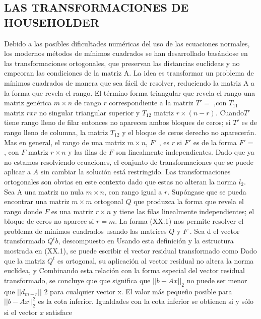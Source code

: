 \documentclass[twocolumn,twoside]{article}
\begin{document}
\subsection{LAS TRANSFORMACIONES DE HOUSEHOLDER}
Debido a las posibles dificultades numéricas del uso de las ecuaciones normales, los
modernos métodos de m\'inimos cuadrados se han desarrollado basándose en las transformaciones 
ortogonales, que preservan las distancias eucl\'ideas y no empeoran las
condiciones de la matriz A. La idea es transformar un problema de m\'inimos cuadrados
de manera que sea fácil de resolver, reduciendo la matriz A a la forma que revela el rango.
El término forma triangular que revela el rango una matriz genérica $m\times n$ de rango $r$
correspondiente a la matriz $ T' = $%
,con $T_{11}$ matriz $r x r$ no singular triangular superior y $T_{12}$ matriz $r\times (n-r)$.
Cuando$ T' $ tiene rango lleno de filar entonces no aparecen ambos bloques de ceros; si $T'$ es de rango lleno de columna, la
matriz $T_{12}$ y el bloque de ceros derecho no aparecerán. Mas en general, el rango de una 
matriz $m\times n$, $F'$ , es $r$ si $F'$ es de la forma $F' =$%
, con $F$ matriz $r\times n$ y las filas de $F$ son linealmente independientes.
Dado que ya no estamos resolviendo ecuaciones, el conjunto de transformaciones
que se puede aplicar a $A$ sin cambiar la solución está restringido. Las transformaciones
ortogonales son obvias en este contexto dado que estas no alteran la norma $l_{2}$.
Sea A una matriz no nula $m\times n$, con rango igual a $r$. Supóngase que se pueda
encontrar una matriz $m\times m$ ortogonal $Q$ que produzca la forma que revela el rango
donde $F$ es una matriz $r\times n$ y tiene las filas linealmente independientes; el bloque de
ceros no aparece si $r = m$.
La forma (XX.1) nos permite resolver el problema de m\'inimos cuadrados usando las
matrices $Q$ y $F$ . Sea d el vector transformado $Q^{t} b$, descompuesto en
Usando esta definición y la estructura mostrada en (XX.1), se puede escribir el vector
residual transformado como
Dado que la matriz $Q^{t}$ es ortogonal, su aplicación al vector residual no altera la norma
eucl\'idea, y
Combinando esta relación con la forma especial del vector residual transformado, se concluye que
que significa que $||b-Ax||_{2}$  no puede ser menor que $||d_{m-r} ||$ 2 para cualquier vector x.
El valor más pequeño posible para $||b-Ax||_{2}^{2}$ es la cota inferior. Igualdades con la cota
inferior se obtienen si y sólo si el vector $x$ satisface
\end{document}
